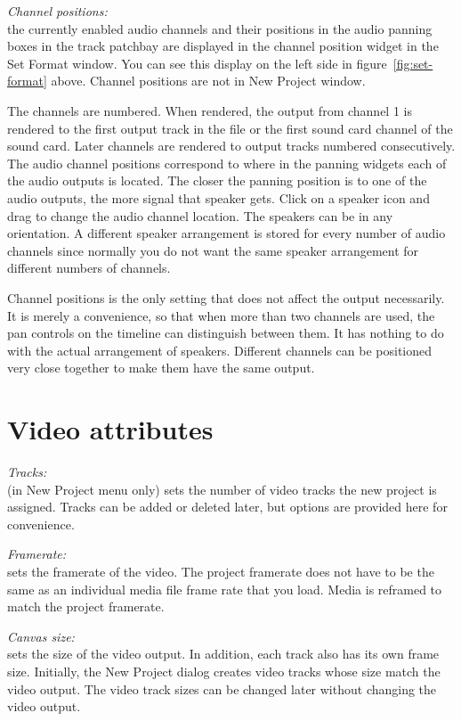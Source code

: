 \textit{Channel positions:}\\
the currently enabled audio channels and their positions in the audio panning boxes in the track patchbay are displayed in the channel position widget in the Set Format window.  You can see this display on the left side in figure~\ref{fig:set-format} above. Channel positions are not in New Project window.

\vspace{1ex}The channels are numbered. When rendered, the output from channel 1 is rendered to the first output track in the file or the first sound card channel of the sound card. Later channels are rendered to output tracks numbered consecutively. The audio channel positions correspond to where in the panning widgets each of the audio outputs is located. The closer the panning position is to one of the audio outputs, the more signal that speaker gets. Click on a speaker icon and drag to change the audio channel location. The speakers can be in any orientation. A different speaker arrangement is stored for every
number of audio channels since normally you do not want the same speaker arrangement for different numbers of channels.

Channel positions is the only setting that does not affect the output necessarily. It is merely a convenience, so that when more than two channels are used, the pan controls on the timeline can distinguish between them. It has nothing to do with the actual arrangement of speakers. Different channels can be positioned very close together to make them have the same output.

\section{Video attributes}%
\label{sec:video_attributes}

\textit{Tracks:}\\
(in New Project menu only) sets the number of video tracks the new project is assigned. Tracks can be added or deleted later, but options are provided here for convenience.

\textit{Framerate:}\\
sets the framerate of the video. The project framerate does not have to be the same as an individual media file frame rate that you load. Media is reframed to match the project framerate.

\textit{Canvas size:}\\
sets the size of the video output. In addition, each track also has its own frame size. Initially, the New Project dialog creates video tracks whose size match the video output. The video    track sizes can be changed later without changing the video output.

